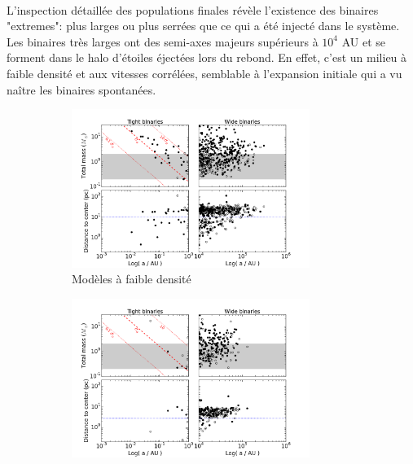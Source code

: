 \paragraph*{}
L'inspection d\'etaill\'ee des populations finales r\'ev\`ele l'existence des binaires "extremes": plus larges ou plus serr\'ees que ce qui a \'et\'e inject\'e dans le syst\`eme. Les binaires tr\`es larges ont des semi-axes majeurs sup\'erieurs \`a $10^4$ AU et se forment dans le halo d'\'etoiles \'eject\'ees lors du rebond. En effet, c'est un milieu \`a faible densit\'e et aux vitesses corr\'el\'ees, semblable \`a l'expansion initiale qui a vu naître les binaires spontan\'ees.

\begin{figure}
\begin{center}
    \begin{subfigure}[b]{0.9\textwidth}
    	\centering
    	\includegraphics[width=0.85\textwidth]{Figures/6_extreme_binaries_LD}
        \caption{Mod\`eles \`a faible densit\'e}
        \label{Fig:6_extreme_LD}
    \end{subfigure}
    \begin{subfigure}[b]{0.9\textwidth}
    	\centering
    	\includegraphics[width=0.85\textwidth]{Figures/6_extreme_binaries_HD}

\end{subfigure}
\end{center}
\end{figure}

